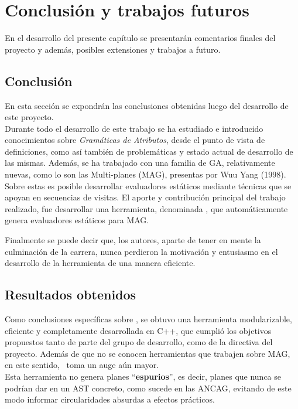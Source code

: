 \chapter{Conclusión y trabajos futuros}
\label{chap:conclusiones}

\minitoc

En el desarrollo del presente capítulo se presentarán comentarios finales del proyecto y además, posibles extensiones y trabajos a futuro.

\section{Conclusión}

En esta sección se expondrán las conclusiones obtenidas luego del desarrollo de este proyecto.\\

Durante todo el desarrollo de este trabajo se ha estudiado e introducido conocimientos sobre \textit{Gramáticas de Atributos}, desde el punto de vista de definiciones, como así también de problemáticas y estado actual de desarrollo de las mismas. Además, se ha trabajado con una familia de GA, relativamente nuevas, como lo son las Multi-planes (MAG), presentas por Wuu Yang (1998). Sobre estas es posible desarrollar evaluadores estáticos mediante técnicas que se apoyan en secuencias de visitas. El aporte y contribución principal del trabajo realizado, fue desarrollar una herramienta, denominada \maggen, que automáticamente genera evaluadores estáticos para MAG.

Finalmente se puede decir que, los autores, aparte de tener en mente la culminación de la carrera, nunca perdieron la motivación y entusiasmo en el desarrollo de la herramienta de una manera eficiente.

\section{Resultados obtenidos}

Como conclusiones específicas sobre \maggen, se obtuvo una herramienta modularizable, eficiente y completamente desarrollada en C++, que cumplió los objetivos propuestos tanto de parte del grupo de desarrollo, como de la directiva del proyecto. Además de que no se conocen herramientas que trabajen sobre MAG, en este sentido, \maggen\ toma un auge aún mayor.\\

Esta herramienta no genera planes ``\textbf{espurios}'', es decir, planes que nunca se podrían dar en un AST concreto, como sucede en las ANCAG, evitando de este modo informar circularidades absurdas a efectos prácticos.


